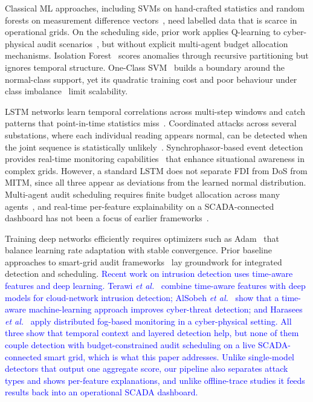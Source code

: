 \documentclass[conference,a4paper]{IEEEtran}
\begin{document}
Classical ML approaches, including SVMs on hand-crafted statistics and random forests on measurement difference vectors~\cite{b6}, need labelled data that is scarce in operational grids. On the scheduling side, prior work applies Q-learning to cyber-physical audit scenarios~\cite{b7}, but without explicit multi-agent budget allocation mechanisms. Isolation Forest~\cite{b8} scores anomalies through recursive partitioning but ignores temporal structure. One-Class SVM~\cite{b9} builds a boundary around the normal-class support, yet its quadratic training cost and poor behaviour under class imbalance~\cite{b10} limit scalability.

LSTM networks learn temporal correlations across multi-step windows and catch patterns that point-in-time statistics miss~\cite{b11}. Coordinated attacks across several substations, where each individual reading appears normal, can be detected when the joint sequence is statistically unlikely~\cite{b12}. Synchrophasor-based event detection provides real-time monitoring capabilities~\cite{b13} that enhance situational awareness in complex grids. However, a standard LSTM does not separate FDI from DoS from MITM, since all three appear as deviations from the learned normal distribution. Multi-agent audit scheduling requires finite budget allocation across many agents~\cite{b14}, and real-time per-feature explainability on a SCADA-connected dashboard has not been a focus of earlier frameworks~\cite{b15}.

Training deep networks efficiently requires optimizers such as Adam~\cite{b16} that balance learning rate adaptation with stable convergence. Prior baseline approaches to smart-grid audit frameworks~\cite{b17} lay groundwork for integrated detection and scheduling. \textcolor{blue}{Recent work on intrusion detection uses time-aware features and deep learning.} \textcolor{blue}{Terawi \textit{et al.}~\cite{b18} combine time-aware features with deep models for cloud-network intrusion detection; AlSobeh \textit{et al.}~\cite{b19} show that a time-aware machine-learning approach improves cyber-threat detection; and Harasees \textit{et al.}~\cite{b20} apply distributed fog-based monitoring in a cyber-physical setting. All three show that temporal context and layered detection help, but none of them couple detection with budget-constrained audit scheduling on a live SCADA-connected smart grid, which is what this paper addresses. Unlike single-model detectors that output one aggregate score, our pipeline also separates attack types and shows per-feature explanations, and unlike offline-trace studies it feeds results back into an operational SCADA dashboard.}
\end{document}
